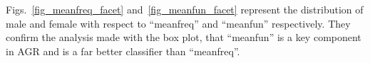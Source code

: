 Figs.~\ref{fig_meanfreq_facet} and~\ref{fig_meanfun_facet} represent the distribution of male and female with respect to ``meanfreq'' and ``meanfun'' respectively. They confirm the analysis made with the box plot, \ie{} that ``meanfun'' is a key component in AGR and is a far better classifier than ``meanfreq''.
\setlength{\BoxPlotFigWidth}{0.48\textwidth}
